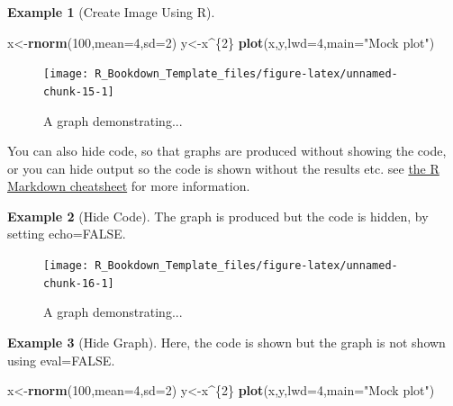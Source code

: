 \documentclass[
]{article}
\newenvironment{Shaded}{\begin{snugshade}}{\end{snugshade}}
\newcommand{\AttributeTok}[1]{\textcolor[rgb]{0.13,0.29,0.53}{#1}}
\newcommand{\DecValTok}[1]{\textcolor[rgb]{0.00,0.00,0.81}{#1}}
\newcommand{\FunctionTok}[1]{\textcolor[rgb]{0.13,0.29,0.53}{\textbf{#1}}}
\newcommand{\NormalTok}[1]{#1}
\newcommand{\OtherTok}[1]{\textcolor[rgb]{0.56,0.35,0.01}{#1}}
\newcommand{\SpecialCharTok}[1]{\textcolor[rgb]{0.81,0.36,0.00}{\textbf{#1}}}
\newcommand{\StringTok}[1]{\textcolor[rgb]{0.31,0.60,0.02}{#1}}
\numberwithin{equation}{section}
\numberwithin{figure}{section}
\theoremstyle{break}
\theoremstyle{definition}
\theoremstyle{definition}
\newtheorem{example}{Example}[section]
\theoremstyle{definition}
\theoremstyle{definition}
\theoremstyle{remark}
\begin{document}
\begin{example}[Create Image Using R]
\leavevmode

\begin{Shaded}
\begin{Highlighting}[]
\NormalTok{x}\OtherTok{\textless{}{-}}\FunctionTok{rnorm}\NormalTok{(}\DecValTok{100}\NormalTok{,}\AttributeTok{mean=}\DecValTok{4}\NormalTok{,}\AttributeTok{sd=}\DecValTok{2}\NormalTok{)}
\NormalTok{y}\OtherTok{\textless{}{-}}\NormalTok{x}\SpecialCharTok{\^{}}\NormalTok{\{}\DecValTok{2}\NormalTok{\}}
\FunctionTok{plot}\NormalTok{(x,y,}\AttributeTok{lwd=}\DecValTok{4}\NormalTok{,}\AttributeTok{main=}\StringTok{"Mock plot"}\NormalTok{)}
\end{Highlighting}
\end{Shaded}

\begin{figure}
\texttt{[image: R\_Bookdown\_Template\_files/figure-latex/unnamed-chunk-15-1]} \caption{A graph demonstrating...}\label{fig:unnamed-chunk-15}
\end{figure}

\end{example}

You can also hide code, so that graphs are produced without showing the code, or you can hide output so the code is shown without the results etc. see \href{https://rstudio.com/wp-content/uploads/2015/02/rmarkdown-cheatsheet.pdf?target=_blank}{the R Markdown cheatsheet} for more information.

\begin{example}[Hide Code]

The graph is produced but the code is hidden, by setting echo=FALSE.

\begin{figure}
\texttt{[image: R\_Bookdown\_Template\_files/figure-latex/unnamed-chunk-16-1]} \caption{A graph demonstrating...}\label{fig:unnamed-chunk-16}
\end{figure}

\end{example}

\begin{example}[Hide Graph]

Here, the code is shown but the graph is not shown using eval=FALSE.

\begin{Shaded}
\begin{Highlighting}[]
\NormalTok{x}\OtherTok{\textless{}{-}}\FunctionTok{rnorm}\NormalTok{(}\DecValTok{100}\NormalTok{,}\AttributeTok{mean=}\DecValTok{4}\NormalTok{,}\AttributeTok{sd=}\DecValTok{2}\NormalTok{)}
\NormalTok{y}\OtherTok{\textless{}{-}}\NormalTok{x}\SpecialCharTok{\^{}}\NormalTok{\{}\DecValTok{2}\NormalTok{\}}
\FunctionTok{plot}\NormalTok{(x,y,}\AttributeTok{lwd=}\DecValTok{4}\NormalTok{,}\AttributeTok{main=}\StringTok{"Mock plot"}\NormalTok{)}
\end{Highlighting}
\end{Shaded}

\end{example}
\end{document}
